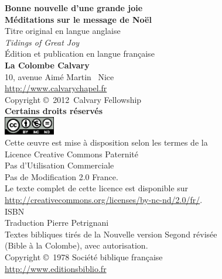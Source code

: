 \newpage
\mbox{}
\vfill

{\scriptsize

\textbf{Bonne nouvelle d'une grande joie\\
 Méditations sur le message de No\"el} \\

Titre original en langue anglaise\frcolon{}\\
\emph{Tidings of Great Joy} \\

Édition et publication en langue fran\c{c}aise\frcolon{}\\
 {\bfseries La Colombe Calvary}\\
 10, avenue Aimé Martin ~Nice\\
 \url{http://www.calvarychapel.fr} \\

Copyright \copyright{}~2012~Calvary Fellowship \\

\textbf{Certains droits réservés} \\

\includegraphics[width=6em]{by-nc-nd_eu} \\

Cette \oe{}uvre est mise à disposition selon les termes de la \\
 Licence Creative Commons Paternité \\
 \ocadr Pas d'Utilisation Commerciale \\
 \ocadr Pas de Modification 2.0 France. \\

Le texte complet de cette licence est disponible sur \\
 \url{http://creativecommons.org/licenses/by-nc-nd/2.0/fr/}. \\

ISBN~\isbn \\

Traduction\frcolon{} Pierre Petrignani \\

Textes bibliques tirés de la Nouvelle version Segond révisée \\
 (Bible à la Colombe), avec autorisation. \\
 Copyright \copyright{}~1978 Société biblique fran\c{c}aise \\
 \url{http://www.editionsbiblio.fr}

}
\pagebreak

